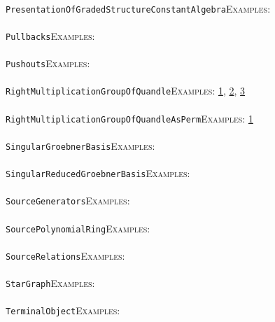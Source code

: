 \documentclass[a4paper,11pt]{report}
\begin{document}
{{ \\
 \texttt{PresentationOfGradedStructureConstantAlgebra}{\nobreakspace}{\nobreakspace}{\nobreakspace}{\nobreakspace}\textsc{Examples:} \\
 \\
 \texttt{Pullbacks}{\nobreakspace}{\nobreakspace}{\nobreakspace}{\nobreakspace}\textsc{Examples:} \\
 \\
 \texttt{Pushouts}{\nobreakspace}{\nobreakspace}{\nobreakspace}{\nobreakspace}\textsc{Examples:} \\
 \\
 \texttt{RightMultiplicationGroupOfQuandle}{\nobreakspace}{\nobreakspace}{\nobreakspace}{\nobreakspace}\textsc{Examples:} \href{../www/SideLinks/About/aboutQuandles2.html} {1}{\nobreakspace}, \href{../www/SideLinks/About/aboutQuandles.html} {2}{\nobreakspace}, \href{../www/SideLinks/About/aboutKnotsQuandles.html} {3}{\nobreakspace} \\
 \\
 \texttt{RightMultiplicationGroupOfQuandleAsPerm}{\nobreakspace}{\nobreakspace}{\nobreakspace}{\nobreakspace}\textsc{Examples:} \href{../www/SideLinks/About/aboutQuandles.html} {1}{\nobreakspace} \\
 \\
 \texttt{SingularGroebnerBasis}{\nobreakspace}{\nobreakspace}{\nobreakspace}{\nobreakspace}\textsc{Examples:} \\
 \\
 \texttt{SingularReducedGroebnerBasis}{\nobreakspace}{\nobreakspace}{\nobreakspace}{\nobreakspace}\textsc{Examples:} \\
 \\
 \texttt{SourceGenerators}{\nobreakspace}{\nobreakspace}{\nobreakspace}{\nobreakspace}\textsc{Examples:} \\
 \\
 \texttt{SourcePolynomialRing}{\nobreakspace}{\nobreakspace}{\nobreakspace}{\nobreakspace}\textsc{Examples:} \\
 \\
 \texttt{SourceRelations}{\nobreakspace}{\nobreakspace}{\nobreakspace}{\nobreakspace}\textsc{Examples:} \\
 \\
 \texttt{StarGraph}{\nobreakspace}{\nobreakspace}{\nobreakspace}{\nobreakspace}\textsc{Examples:} \\
 \\
 \texttt{TerminalObject}{\nobreakspace}{\nobreakspace}{\nobreakspace}{\nobreakspace}\textsc{Examples:} \\
}}
\end{document}
